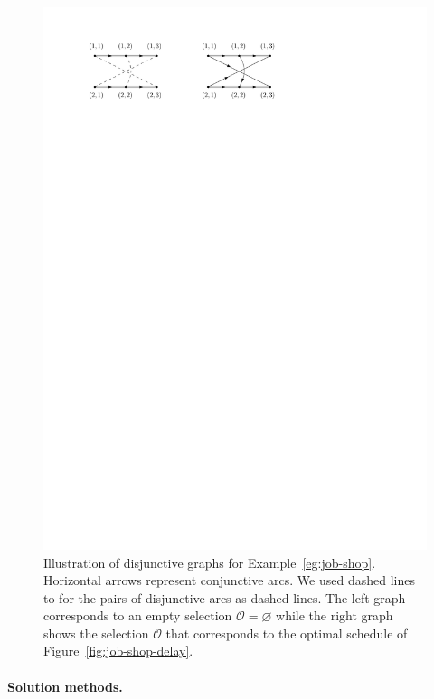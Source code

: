 \documentclass[a4paper]{report}
\theoremstyle{definition}
\theoremstyle{plain}
\begin{document}
\begin{figure}
  \centering
  \includegraphics[scale=1]{figures/disjunctive_graph.pdf}
  \caption{Illustration of disjunctive graphs for Example~\ref{eg:job-shop}.
    Horizontal arrows represent conjunctive arcs. We used dashed lines to for
    the pairs of disjunctive arcs as dashed lines. The left graph corresponds to
    an empty selection $\mathcal{O} = \varnothing$ while the right graph shows
    the selection $\mathcal{O}$ that corresponds to the optimal schedule of
    Figure~\ref{fig:job-shop-delay}.}
  \label{fig:disjunctive-graphs}
\end{figure}


\paragraph{Solution methods.}
\end{document}
